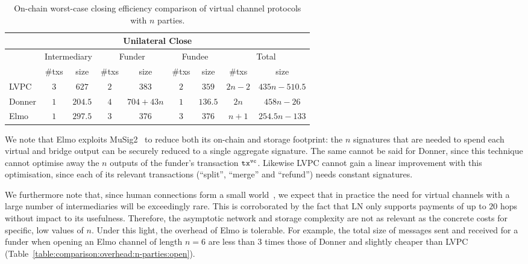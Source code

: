  \begin{table}[h!]
    \begin{minipage}{\textwidth}
    \centering
    \begin{tabular}{|l|c|c|c|c|c|c|c|c|}
    \hline
    \multicolumn{9}{|c|}{Unilateral Close} \\
    \hline
              & \multicolumn{2}{|c|}{Intermediary}
              & \multicolumn{2}{|c|}{Funder} & \multicolumn{2}{|c|}{Fundee}
              & \multicolumn{2}{|c|}{Total} \\
    \hline
              & \#txs & size & \#txs & size & \#txs & size & \#txs & size \\
    \hline
    LVPC      & $3$ & $627$ & $2$ & $383$ & $2$ & $359$ & $2n-2$ & $435n -
              510.5$ \\
    \hline
    Donner    & $1$ & $204.5$ & $4$ & $704 + 43n$ & $1$ & $136.5$ & $2n$ & $458n
              - 26$ \\
    \hline
    Elmo      & $1$ & $297.5$ & $3$ & $376$ & $3$ & $376$
              & $n+1$ & $254.5n-133$ \\
    \hline
    \end{tabular}
    \end{minipage}
    \caption{On-chain worst-case closing efficiency comparison of virtual
    channel protocols with $n$ parties.}
    \label{table:comparison:overhead:n-parties:close}
  \end{table}

  We note that Elmo exploits
  MuSig2~\cite{DBLP:journals/dcc/MaxwellPSW19,DBLP:conf/crypto/NickRS21} to
  reduce both its
  on-chain and storage footprint: the $n$ signatures that are needed to spend
  each virtual and bridge output can be securely reduced to a single aggregate
  signature. The same cannot be said for
  Donner, since this technique cannot optimise away the $n$ outputs of the
  funder's transaction $\texttt{tx}^{\mathtt{vc}}$. Likewise LVPC cannot gain a linear
  improvement with this optimisation, since each of its relevant transactions
  (``split'', ``merge'' and ``refund'') needs constant signatures.

  We furthermore note that, since human connections form a
  small world~\cite{smallworld}, we expect that in practice the
  need for virtual channels with a large number of
  intermediaries will be exceedingly rare. This is corroborated by
  the fact that LN only supports payments of up to $20$ hops
  without impact to its usefulness. Therefore, the asymptotic
  network and storage complexity are not as relevant as the
  concrete costs for specific, low values of $n$. Under this
  light, the overhead of Elmo is tolerable. For example, the
  total size of messages sent and received for a funder when opening an Elmo channel
  of length $n=6$ are less than $3$ times those of Donner and
  slightly cheaper than LVPC
  (Table~\ref{table:comparison:overhead:n-parties:open}).

